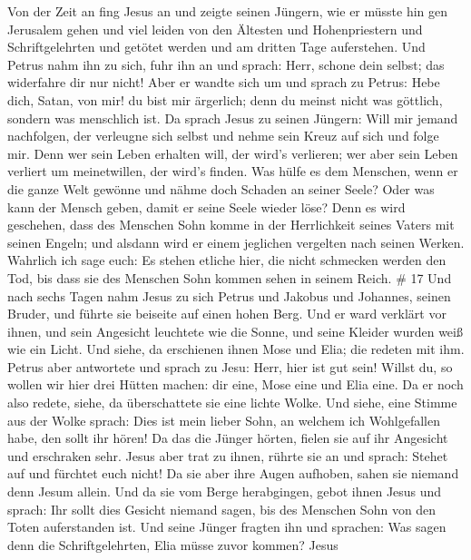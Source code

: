 Von der Zeit an fing Jesus an und zeigte seinen Jüngern, wie er müsste
hin gen Jerusalem gehen und viel leiden von den Ältesten und
Hohenpriestern und Schriftgelehrten und getötet werden und am dritten
Tage auferstehen.  Und Petrus nahm ihn zu sich, fuhr ihn an
und sprach: Herr, schone dein selbst; das widerfahre dir nur nicht!
 Aber er wandte sich um und sprach zu Petrus: Hebe dich,
Satan, von mir! du bist mir ärgerlich; denn du meinst nicht was
göttlich, sondern was menschlich ist.  Da sprach Jesus zu
seinen Jüngern: Will mir jemand nachfolgen, der verleugne sich selbst
und nehme sein Kreuz auf sich und folge mir.  Denn wer sein
Leben erhalten will, der wird's verlieren; wer aber sein Leben verliert
um meinetwillen, der wird's finden.  Was hülfe es dem
Menschen, wenn er die ganze Welt gewönne und nähme doch Schaden an
seiner Seele? Oder was kann der Mensch geben, damit er seine Seele
wieder löse?  Denn es wird geschehen, dass des Menschen
Sohn komme in der Herrlichkeit seines Vaters mit seinen Engeln; und
alsdann wird er einem jeglichen vergelten nach seinen Werken.
 Wahrlich ich sage euch: Es stehen etliche hier, die nicht
schmecken werden den Tod, bis dass sie des Menschen Sohn kommen sehen in
seinem Reich. \# 17  Und nach sechs Tagen nahm Jesus zu sich
Petrus und Jakobus und Johannes, seinen Bruder, und führte sie beiseite
auf einen hohen Berg.  Und er ward verklärt vor ihnen, und
sein Angesicht leuchtete wie die Sonne, und seine Kleider wurden weiß
wie ein Licht.  Und siehe, da erschienen ihnen Mose und
Elia; die redeten mit ihm.  Petrus aber antwortete und
sprach zu Jesu: Herr, hier ist gut sein! Willst du, so wollen wir hier
drei Hütten machen: dir eine, Mose eine und Elia eine.  Da
er noch also redete, siehe, da überschattete sie eine lichte Wolke. Und
siehe, eine Stimme aus der Wolke sprach: Dies ist mein lieber Sohn, an
welchem ich Wohlgefallen habe, den sollt ihr hören!  Da das
die Jünger hörten, fielen sie auf ihr Angesicht und erschraken sehr.
 Jesus aber trat zu ihnen, rührte sie an und sprach: Stehet
auf und fürchtet euch nicht!  Da sie aber ihre Augen
aufhoben, sahen sie niemand denn Jesum allein.  Und da sie
vom Berge herabgingen, gebot ihnen Jesus und sprach: Ihr sollt dies
Gesicht niemand sagen, bis des Menschen Sohn von den Toten auferstanden
ist.  Und seine Jünger fragten ihn und sprachen: Was sagen
denn die Schriftgelehrten, Elia müsse zuvor kommen?  Jesus

